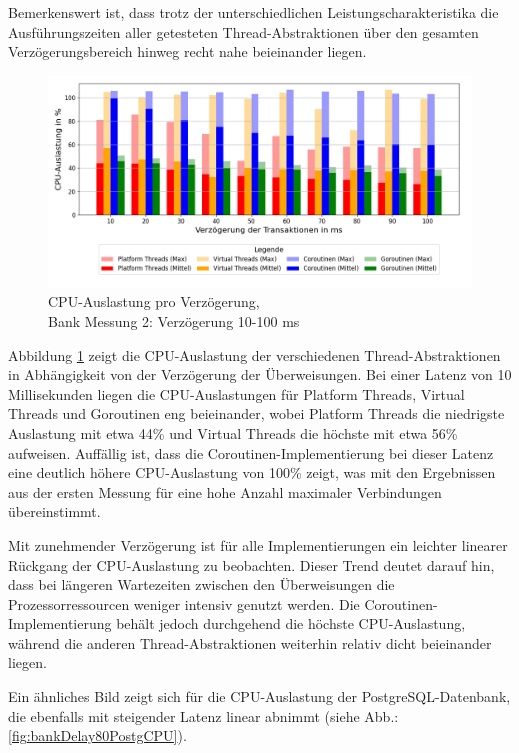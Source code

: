 \documentclass[fontsize=12pt,paper=a4,twoside=semi,parskip=half-,headsepline,headinclude]{scrreprt}
\begin{document}
Bemerkenswert ist, dass trotz der unterschiedlichen Leistungscharakteristika die Aus\-füh\-rungs\-zei\-ten aller getesteten Thread-Abstraktionen über den gesamten Ver\-zö\-ge\-rungs\-be\-reich hinweg recht nahe beieinander liegen.

\begin{figure}[H]
	\centering
	\includegraphics[scale=0.5]{figures/bank/delay80/cpu_usage_bar_plot.png}
	\caption{CPU-Auslastung pro Verzögerung,\\ Bank Messung 2: Verzögerung 10-100 ms}
	\label{fig:bankDelay80CPU}
\end{figure}

Abbildung \ref{fig:bankDelay80CPU} zeigt die CPU-Auslastung der verschiedenen Thread-Abstraktionen in Abhängigkeit von der Verzögerung der Überweisungen. Bei einer Latenz von 10 Millisekunden liegen die CPU-Auslastungen für Platform Threads, Virtual Threads und Goroutinen eng beieinander, wobei Platform Threads die niedrigste Auslastung mit etwa 44\% und Virtual Threads die höchste mit etwa 56\% aufweisen. Auffällig ist, dass die Coroutinen-Implementierung bei dieser Latenz eine deutlich höhere CPU-Auslastung von 100\% zeigt, was mit den Ergebnissen aus der ersten Messung für eine hohe Anzahl maximaler Verbindungen übereinstimmt.

Mit zunehmender Verzögerung ist für alle Implementierungen ein leichter linearer Rück\-gang der CPU-Auslastung zu beobachten. Dieser Trend deutet darauf hin, dass bei längeren Wartezeiten zwischen den Überweisungen die Prozessorressourcen weniger intensiv genutzt werden. Die Coroutinen-Implementierung behält jedoch durchgehend die höchste CPU-Auslastung, während die anderen Thread-Abstraktionen weiterhin relativ dicht beieinander liegen.

Ein ähnliches Bild zeigt sich für die CPU-Auslastung der PostgreSQL-Datenbank, die ebenfalls mit steigender Latenz linear abnimmt (siehe Abb.: \ref{fig:bankDelay80PostgCPU}). 
\end{document}
